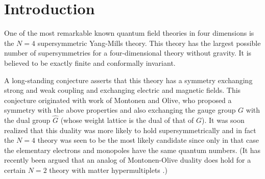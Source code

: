 \documentclass[12pt]{article}
\numberwithin{equation}{section}
\begin{document}

\section{Introduction}

One of the most remarkable known quantum field theories in four  dimensions
is the $N=4$ supersymmetric Yang-Mills theory.  This theory
has the largest possible number of supersymmetries
for a four-dimensional theory without gravity.
It is believed
to be exactly finite and conformally invariant.

A long-standing conjecture asserts that this theory has a symmetry exchanging
strong and weak coupling and exchanging
electric and magnetic fields.
This conjecture originated with work of
Montonen and Olive, who  \cite{om}
proposed a symmetry with the above properties
and also exchanging the gauge group $G$ with the dual group $\widehat G$
(whose weight lattice is the dual of that of $G$).
It was soon realized that this duality was more likely to hold
supersymmetrically
\cite{wo}
and in fact the $N=4 $
theory was seen to be the most likely candidate
\cite{osb} since only in that
case the elementary electrons and monopoles have the same quantum numbers.
(It has recently been argued that an analog of Montonen-Olive duality
  does hold for a certain $N=2$ theory with matter hypermultiplets
\cite{ws}.)
\end{document}
